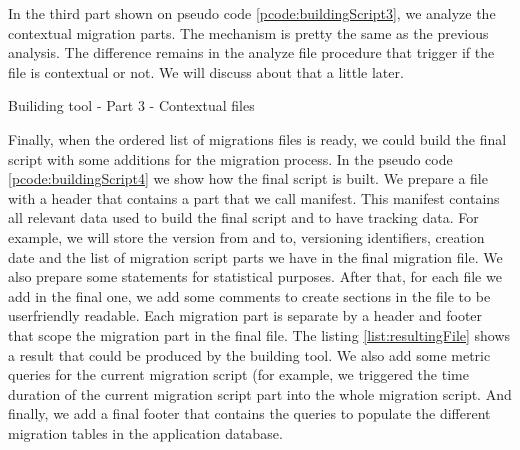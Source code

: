 In the third part shown on pseudo code \ref{pcode:buildingScript3}, we analyze the contextual migration parts. The mechanism is pretty the same as the previous analysis. The difference remains in the analyze file procedure that trigger if the file is contextual or not. We will discuss about that a little later.

\begin{algorithm}[h]
	\caption{Builiding tool - Part 3 - Contextual files}
	\label{pcode:buildingScript3}
	\begin{algorithmic}
		\State {}
			\State {}
			\State {}
		\EndFor
	\end{algorithmic}
\end{algorithm}

Finally, when the ordered list of migrations files is ready, we could build the final script with some additions for the migration process. In the pseudo code \ref{pcode:buildingScript4} we show how the final script is built. We prepare a file with a header that contains a part that we call manifest. This manifest contains all relevant data used to build the final script and to have tracking data. For example, we will store the version from and to, versioning identifiers, creation date and the list of migration script parts we have in the final migration file. We also prepare some statements for statistical purposes. After that, for each file we add in the final one, we add some comments to create sections in the file to be userfriendly readable. Each migration part is separate by a header and footer that scope the migration part in the final file. The listing \ref{list:resultingFile} shows a result that could be produced by the building tool. We also add some metric queries for the current migration script (for example, we triggered the time duration of the current migration script part into the whole migration script. And finally, we add a final footer that contains the queries to populate the different migration tables in the application database.

